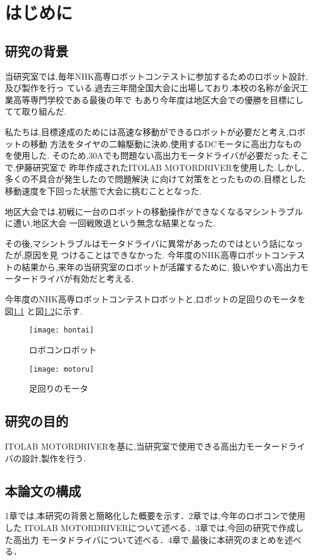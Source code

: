 \chapter{はじめに}

\section{研究の背景}
当研究室では,毎年NHK高専ロボットコンテストに参加するためのロボット設計,及び製作を行っ
ている.過去三年間全国大会に出場しており,本校の名称が金沢工業高等専門学校である最後の年で
もあり今年度は地区大会での優勝を目標にしてて取り組んだ.

私たちは,目標達成のためには高速な移動ができるロボットが必要だと考え,ロボットの移動
方法をタイヤの二輪駆動に決め,使用するDCモータに高出力なものを使用した.
そのため,30Aでも問題ない高出力モータドライバが必要だった.そこで,伊藤研究室で
昨年作成されたITOLAB MOTORDRIVERを使用した.しかし,多くの不具合が発生したので問題解決
に向けて対策をとったものの,目標とした移動速度を下回った状態で大会に挑むこととなった.

地区大会では,初戦に一台のロボットの移動操作ができなくなるマシントラブルに遭い,地区大会
一回戦敗退という無念な結果となった.

その後,マシントラブルはモータドライバに異常があったのではという話になったが,原因を見
つけることはできなかった.
今年度のNHK高専ロボットコンテストの結果から,来年の当研究室のロボットが活躍するために,
扱いやすい高出力モータードライバが有効だと考える.

今年度のNHK高専ロボットコンテストロボットと,ロボットの足回りのモータを図\ref{fig:hontai}
と図\ref{fig:motoru}に示す.
\begin{figure}[H]
  \begin{center}
    \texttt{[image: hontai]}
    \end{center}
  \caption{ロボコンロボット}
 \label{fig:hontai}
\end{figure}
\begin{figure}[H]
  \begin{center}
    \texttt{[image: motoru]}
    \end{center}
  \caption{足回りのモータ}
 \label{fig:motoru}
\end{figure}

\section{研究の目的}
ITOLAB MOTORDRIVERを基に,当研究室で使用できる高出力モータードライバの設計,製作を行う.

\section{本論文の構成}
1章では,本研究の背景と簡略化した概要を示す．2章では,今年のロボコンで使用した
ITOLAB MOTORDRIVERについて述べる．3章では,今回の研究で作成した高出力
モータドライバについて述べる．4章で,最後に本研究のまとめを述べる．